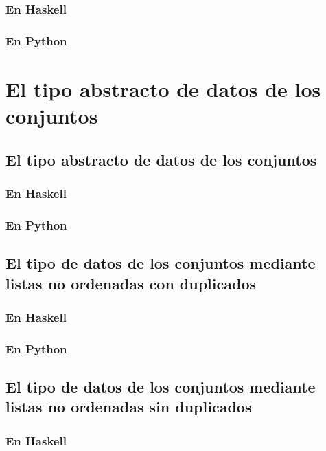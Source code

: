 \documentclass[a4paper,12pt,twoside]{book}
\begin{document}
\subsection{En Haskell}
\subsection{En Python}

\chapter{El tipo abstracto de datos de los conjuntos}

\minitoc

\section{El tipo abstracto de datos de los conjuntos}
\subsection{En Haskell}
\subsection{En Python}

\section{El tipo de datos de los conjuntos mediante listas no ordenadas con duplicados}
\subsection{En Haskell}
\subsection{En Python}

\section{El tipo de datos de los conjuntos mediante listas no ordenadas sin duplicados}
\subsection{En Haskell}
\end{document}
